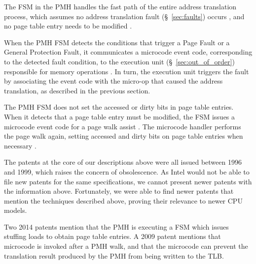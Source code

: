 The FSM in the PMH handles the fast path of the entire address translation
process, which assumes no address translation fault (\S~\ref{sec:faults})
occurs
\cite{intel1996dtlb, intel1997pmh, intel1999exceptions, intel1999events}, and
no page table entry needs to be modified \cite{intel1997pmh}.

When the PMH FSM detects the conditions that trigger a Page Fault or a General
Protection Fault, it communicates a microcode event code, corresponding to the
detected fault condition, to the execution unit (\S~\ref{sec:out_of_order})
responsible for memory operations \cite{intel1996dtlb, intel1997pmh,
intel1999exceptions, intel1999events}. In turn, the execution unit triggers the
fault by associating the event code with the micro-op that caused the address
translation, as described in the previous section.

The PMH FSM does not set the accessed or dirty bits in page table entries. When
it detects that a page table entry must be modified, the FSM issues a microcode
event code for a page walk assist \cite{intel1997pmh}. The microcode handler
performs the page walk again, setting accessed and dirty bits on page table
entries when necessary \cite{intel1997pmh}.

The patents at the core of our descriptions above \cite{intel1996dtlb,
intel1997events, intel1997pmh, intel1999exceptions, intel1999events} were all
issued between 1996 and 1999, which raises the concern of obsolescence. As
Intel would not be able to file new patents for the same specifications, we
cannot present newer patents with the information above. Fortunately, we were
able to find newer patents that mention the techniques described above,
proving their relevance to newer CPU models.


Two 2014 patents \cite{hildesheim2014ptm, raikin2014tlb} mention that the PMH
is executing a FSM which issues stuffing loads to obtain page table entries.
A 2009 patent \cite{intel2009pipeline} mentions that microcode is invoked after
a PMH walk, and that the microcode can prevent the translation result produced
by the PMH from being written to the TLB.


